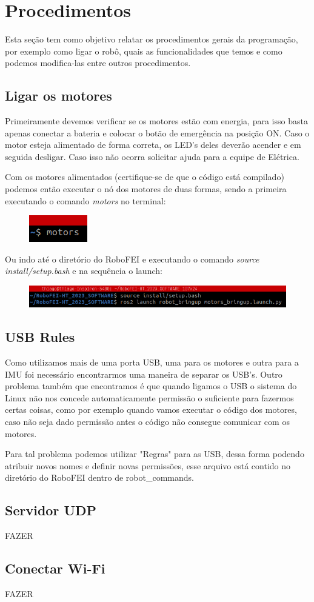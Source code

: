 \section{Procedimentos}
	Esta seção tem como objetivo relatar os procedimentos gerais da programação, por exemplo como ligar o robô, quais as funcionalidades que temos e como podemos modifica-las entre outros procedimentos.
	
	\subsection{Ligar os motores}
		Primeiramente devemos verificar se os motores estão com energia, para isso basta apenas conectar a bateria e colocar o botão de emergência na posição ON. Caso o motor esteja alimentado de forma correta, os LED's deles deverão acender e em seguida desligar. Caso isso não ocorra solicitar ajuda para a equipe de Elétrica.
		
		Com os motores alimentados (certifique-se de que o código está compilado) podemos então executar o nó dos motores de duas formas, sendo a primeira executando o comando \textit{motors} no terminal:
		
		\begin{figure}[H]
			\centering
			\includegraphics[scale=1]{sections/programacao/procedimentos/imagens/comando_motors.png}
		\end{figure}
		
	
		Ou indo até o diretório do RoboFEI e executando o comando \textit{source install/setup.bash} e na sequência o launch:
		
		\begin{figure}[H]
			\centering
			\includegraphics[scale=0.6]{sections/programacao/procedimentos/imagens/launch_motors.png}
		\end{figure}				
		
		
	\subsection{USB Rules}
		Como utilizamos mais de uma porta USB, uma para os motores e outra para a IMU foi necessário encontrarmos uma maneira de separar os USB's. Outro problema também que encontramos é que quando ligamos o USB o sistema do Linux não nos concede automaticamente permissão o suficiente para fazermos certas coisas, como por exemplo quando vamos executar o código dos motores, caso não seja dado permissão antes o código não consegue comunicar com os motores.
		
		Para tal problema podemos utilizar "Regras" para as USB, dessa forma podendo atribuir novos nomes e definir novas permissões, esse arquivo está contido no diretório do RoboFEI dentro de robot\_commands.
		

\subsection{Servidor UDP}
FAZER

\subsection{Conectar Wi-Fi}
FAZER
